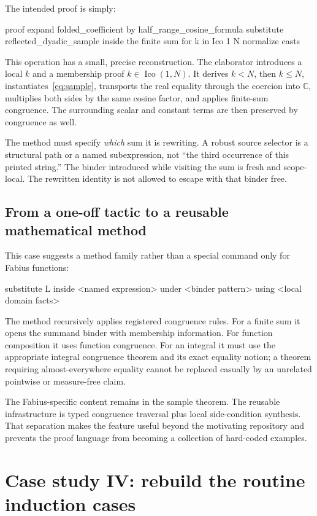 \documentclass[11pt,a4paper]{article}
\theoremstyle{remark}
\newcommand{\C}{\mathbb{C}}
\begin{document}
The intended proof is simply:
\Needspace{82pt}
\begin{code}
proof
  expand folded_coefficient by half_range_cosine_formula
  substitute reflected_dyadic_sample inside the finite sum
    for k in Ico 1 N
  normalize casts
\end{code}
This operation has a small, precise reconstruction. The elaborator introduces a local $k$ and a membership proof $k\in\operatorname{Ico}(1,N)$. It derives $k<N$, then $k\leq N$, instantiates~\eqref{eq:sample}, transports the real equality through the coercion into $\C$, multiplies both sides by the same cosine factor, and applies finite-sum congruence. The surrounding scalar and constant terms are then preserved by congruence as well.

The method must specify \emph{which} sum it is rewriting. A robust source selector is a structural path or a named subexpression, not ``the third occurrence of this printed string.'' The binder introduced while visiting the sum is fresh and scope-local. The rewritten identity is not allowed to escape with that binder free.

\subsection{From a one-off tactic to a reusable mathematical method}
This case suggests a method family rather than a special command only for Fabius functions:
\Needspace{58pt}
\begin{code}
substitute L inside <named expression>
  under <binder pattern>
  using <local domain facts>
\end{code}
The method recursively applies registered congruence rules. For a finite sum it opens the summand binder with membership information. For function composition it uses function congruence. For an integral it must use the appropriate integral congruence theorem and its exact equality notion; a theorem requiring almost-everywhere equality cannot be replaced casually by an unrelated pointwise or measure-free claim.

The Fabius-specific content remains in the sample theorem. The reusable infrastructure is typed congruence traversal plus local side-condition synthesis. That separation makes the feature useful beyond the motivating repository and prevents the proof language from becoming a collection of hard-coded examples.

\section{Case study IV: rebuild the routine induction cases}\label{sec:structural}
\end{document}
